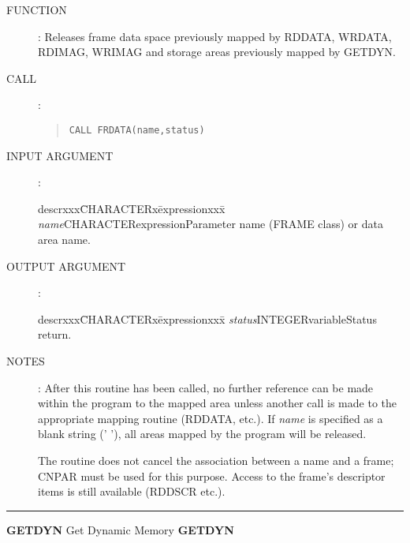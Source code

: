 \documentclass{article}
\begin{document}
\begin{description}
\item [FUNCTION]:
Releases frame data space previously mapped by RDDATA, WRDATA, RDIMAG, WRIMAG
and storage areas previously mapped by GETDYN.
\item [CALL]:
\begin{quote}
{\tt CALL FRDATA(name,status)}
\end{quote}
\item [INPUT ARGUMENT]:
\begin{tabbing}
descrxxx\=CHARACTERx\=expressionxxx\=\kill
{\em name}\>CHARACTER\>expression\>Parameter name (FRAME class) or data area name.
\end{tabbing}
\item [OUTPUT ARGUMENT]:
\begin{tabbing}
descrxxx\=CHARACTERx\=expressionxxx\=\kill
{\em status}\>INTEGER\>variable\>Status return.
\end{tabbing}
\item [NOTES]:
After this routine has been called, no further reference can be made within the
program to the mapped area unless another call is made to the appropriate
mapping routine (RDDATA, etc.).
If {\em name} is specified as a blank string (' '), all areas mapped by the
program will be released.

The routine does not cancel the association between a name and a frame; CNPAR
must be used for this purpose.
Access to the frame's descriptor items is still available (RDDSCR etc.).
\end{description}
\rule{\textwidth}{0.3mm}
{\Large {\bf GETDYN} \hfill Get Dynamic Memory \hfill {\bf GETDYN}}
\end{document}
